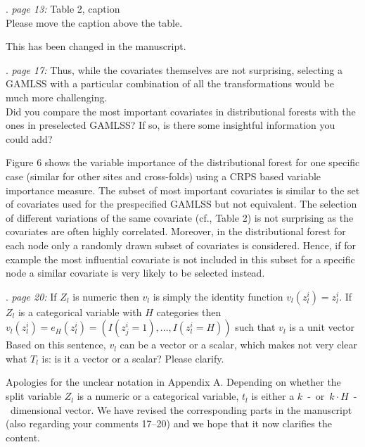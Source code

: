 \documentclass[american,foldmarks=false,noconfig]{uibklttr}
\newenvironment{review}{\fontshape{\itdefault}\fontseries{\bfdefault} \selectfont \smallskip}{\par}
\begin{document}
\begin{review}
14. {\color{quotecolor}\textit{page 13:} Table 2, caption}\\
Please move the caption above the table.
\end{review}

This has been changed in the manuscript.

\begin{review}
15. {\color{quotecolor}\textit{page 17:} Thus, while the covariates 
themselves are not surprising, selecting a GAMLSS with a particular 
combination of all the transformations would be much more challenging.}\\
Did you compare the most important covariates in distributional forests
with the ones in preselected GAMLSS? If so, is there some insightful
information you could add?
\end{review}

Figure 6 shows the variable importance of the distributional forest
for one specific case (similar for other sites and cross-folds) 
using a CRPS based variable importance measure. The subset of 
most important covariates is similar to the set of covariates 
used for the prespecified GAMLSS but not equivalent.
The selection of different variations of the same covariate (cf., Table 2)
is not surprising as the covariates are often highly correlated.
Moreover, in the distributional forest for each node only a randomly
drawn subset of covariates is considered. Hence, if for example the most 
influential covariate is not included in this subset for a specific node 
a similar covariate is very likely to be selected instead.


\begin{review}
16. {\color{quotecolor}\textit{page 20:} If $Z_l$ is numeric 
then $v_l$ is simply the identity function $v_l(z_l^i) = z_l^i$. 
If $Z_l$ is a categorical variable with $H$ categories then 
$v_l(z_l^i) = e_H(z_l^i) = (I(z_j^i = 1), \dots , I(z_l^i = H))$ 
such that $v_l$ is a unit vector}\\
Based on this sentence, $v_l$ can be a vector or a scalar, 
which makes not very clear what $T_l$ is: is it a vector 
or a scalar? Please clarify.
\end{review}

Apologies for the unclear notation in Appendix A.
Depending on whether the split variable $Z_l$ is a numeric 
or a categorical variable, $t_l$ is either a
$k$~-~or~$k \cdot H$~-~dimensional vector.
We have revised the corresponding parts in the manuscript (also 
regarding your comments 17--20) and we hope that it now clarifies 
the content.
\end{document}
